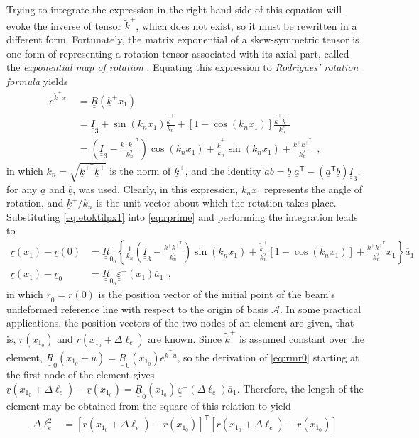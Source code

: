 \documentclass[12pt,a4paper,oneside,english]{abntex2} %
\newcommand{\fix}[1]{{\color{red}#1}}
\newcommand{\vect}[1]{\underline{#1}}
\newcommand{\uvec}[1]{\overline{#1}}
\def\tens#1{\underline{\underline{#1}}}
\def\til#1{\widetilde{#1}}
\def\lb{\left[}
\def\rb{\right]}
\def\lp{\left(}
\def\rp{\right)}
\def\T{\mathsf{T}}
\def\A{\mathcal{A}}
\def\Ithree{\tens{I}_3}
\def\xo{x_1}
\def\aone{\uvec{a}_1}
\def\R{\tens{R}}
\def\Rz{\R_0}
\def\Rzz{\R_{0_0}}
\def\r{\vect{r}}
\def\k{\vect{k}}
\def\kp{\k^{+}}
\def\kpT{\k^{+^\T}}
\def\ktil{\til{k}}
\def\ktilp{\ktil^{+}}
\def\Deltal{\Delta \ell_e}
\def\xoz{x_{1_0}}
\def\rz{\r_0}
\def\kn{k_{n}}
\def\knt{\kn^2}
\def\kkT{\kp\k^{+^\T}}
\def\varepsten{\tens{\varepsilon}}
\def\varepstenp{\varepsten^+}
\begin{document}
\begin{apendicesenv}
Trying to integrate the expression in the right-hand side of this equation will evoke the inverse of tensor $\ktilp$, which does not exist, so it must be rewritten in a different form. Fortunately, the matrix exponential of a skew-symmetric tensor is one form of representing a rotation tensor associated with its axial part, called the \textit{exponential map of rotation} \cite{bauchau2011flexible}. Equating this expression to \textit{Rodrigues' rotation formula} \cite{bauchau2011flexible} yields
\begin{align}
    e^{\ktilp\xo} &= \R\lp\kp\xo\rp
    \nonumber \\
    &= \Ithree + \sin\lp\kn\xo\rp\frac{\ktilp}{\kn} + \lb1-\cos\lp\kn\xo\rp\rb\frac{\ktilp\ktilp}{\knt}
    \nonumber \\
    &= \lp\Ithree-\frac{\kkT}{\knt}\rp\cos\lp\kn\xo\rp + \frac{\ktilp}{\kn}\sin\lp\kn\xo\rp + \frac{\kkT}{\knt} \ \ ,
    \label{eq:etoktilpx1}
\end{align}
in which $\kn = \sqrt{\kpT\kp}$ is the norm of $\kp$, and the identity $\til{a}\til{b} = \vect{b}\;\vect{a}^\T-\lp\vect{a}^\T\vect{b}\rp\Ithree$, for any $\vect{a}$ and $\vect{b}$, was used. Clearly, in this expression, $\kn\xo$ represents the angle of rotation, and $\kp/\kn$ is the unit vector about which the rotation takes place. Substituting \cref{eq:etoktilpx1} into \cref{eq:rprime} and performing the integration leads to
\begin{align}
    \r(\xo) - \r(0) &= \Rzz\left\{ \frac{1}{\kn}\lp\Ithree-\frac{\kkT}{\knt}\rp\sin\lp\kn\xo\rp + \frac{\ktilp}{\knt}\lb1-\cos\lp\kn\xo\rp\rb + \frac{\kkT}{\knt}\xo \right\}\aone
    \nonumber \\
    \r(\xo) - \rz &= \Rzz\varepstenp\lp\xo\rp\aone \ \ ,
    \label{eq:rmr0}
\end{align}
in which $\rz = \r(0)$ is the position vector of the initial point of the beam's undeformed reference line with respect to the origin of basis $\A$. In some practical applications, the position vectors of the two nodes of an element are given, that is, $\r\lp\xoz\rp$ and $\r\lp\xoz+\Deltal\rp$ are known. \fix{Since $\ktilp$ is assumed constant over the element, $\Rz\lp\xoz+u\rp=\Rz\lp\xoz\rp e^{\ktilp u}$, so the derivation of \cref{eq:rmr0} starting at the first node of the element gives $\r\lp\xoz+\Deltal\rp-\r\lp\xoz\rp=\Rz\lp\xoz\rp\,\varepstenp\lp\Deltal\rp\aone$. Therefore, the length of the element may be obtained from the square of this relation to yield}
\begin{align}
    \Deltal^2 &= \lb\r\lp\xoz+\Deltal\rp-\r\lp\xoz\rp\rb^\T \lb\r\lp\xoz+\Deltal\rp-\r\lp\xoz\rp\rb 

\end{align}
\end{apendicesenv}
\end{document}
